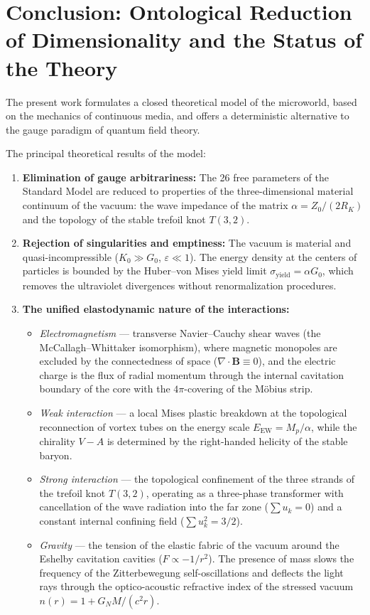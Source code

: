 \documentclass[11pt,a4paper]{article}
\theoremstyle{definition}
\theoremstyle{remark}
\begin{document}
\section{Conclusion: Ontological Reduction of Dimensionality and the Status of the Theory}

The present work formulates a closed theoretical model of the microworld, based on the mechanics of continuous media, and offers a deterministic alternative to the gauge paradigm of quantum field theory.

The principal theoretical results of the model:
\begin{enumerate}
\item \textbf{Elimination of gauge arbitrariness:} The 26 free parameters of the Standard Model are reduced to properties of the three-dimensional material continuum of the vacuum: the wave impedance of the matrix $\alpha = Z_0 / (2 R_K)$ and the topology of the stable trefoil knot $T(3,2)$.
\item \textbf{Rejection of singularities and emptiness:} The vacuum is material and quasi-incompressible ($K_0 \gg G_0$, $\varepsilon \ll 1$). The energy density at the centers of particles is bounded by the Huber--von Mises yield limit $\sigma_{\mathrm{yield}} = \alpha G_0$, which removes the ultraviolet divergences without renormalization procedures.
\item \textbf{The unified elastodynamic nature of the interactions:}
\begin{itemize}
\item \textit{Electromagnetism} --- transverse Navier--Cauchy shear waves (the McCallagh--Whittaker isomorphism), where magnetic monopoles are excluded by the connectedness of space ($\nabla \cdot \mathbf{B} \equiv 0$), and the electric charge is the flux of radial momentum through the internal cavitation boundary of the core with the $4\pi$-covering of the M\"obius strip.
\item \textit{Weak interaction} --- a local Mises plastic breakdown at the topological reconnection of vortex tubes on the energy scale $E_{\mathrm{EW}} = M_p / \alpha$, while the chirality $V-A$ is determined by the right-handed helicity of the stable baryon.
\item \textit{Strong interaction} --- the topological confinement of the three strands of the trefoil knot $T(3,2)$, operating as a three-phase transformer with cancellation of the wave radiation into the far zone ($\sum u_k = 0$) and a constant internal confining field ($\sum u_k^2 = 3/2$).
\item \textit{Gravity} --- the tension of the elastic fabric of the vacuum around the Eshelby cavitation cavities ($F \propto -1/r^2$). The presence of mass slows the frequency of the Zitterbewegung self-oscillations and deflects the light rays through the optico-acoustic refractive index of the stressed vacuum $n(r) = 1 + G_N M / (c^2 r)$.

\end{itemize}
\end{enumerate}
\end{document}

